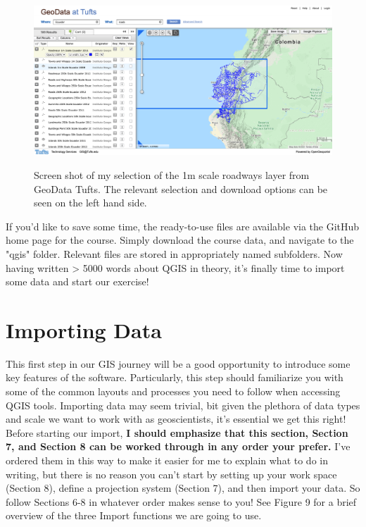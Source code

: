 \documentclass{article}
\begin{document}
\begin{figure}[htbp]
    \centering
    \includegraphics[width=\textwidth]{Fig_8_Tufts.png}
    \label{fig8}
    \caption{Screen shot of my selection of the 1m scale roadways layer from GeoData Tufts. The relevant selection and download options can be seen on the left hand side.}
\end{figure}

If you'd like to save some time, the ready-to-use files are available via the GitHub home page for the course. Simply download the course data, and navigate to the "qgis" folder. Relevant files are stored in appropriately named subfolders. Now having written > 5000 words about QGIS in theory, it's finally time to import some data and start our exercise! 

\section{Importing Data}

This first step in our GIS journey will be a good opportunity to introduce some key features of the software. Particularly, this step should familiarize you with some of the common layouts and processes you need to follow when accessing QGIS tools. Importing data may seem trivial, bit given the plethora of data types and scale we want to work with as geoscientists, it's essential we get this right! Before starting our import, \textbf{I should emphasize that this section, Section 7, and Section 8 can be worked through in any order your prefer.} I've ordered them in this way to make it easier for me to explain what to do in writing, but there is no reason you can't start by setting up your work space (Section 8), define a projection system (Section 7), and then import your data.  So follow Sections 6-8 in whatever order makes sense to you! See Figure 9 for a brief overview of the three Import functions we are going to use. 
\end{document}

